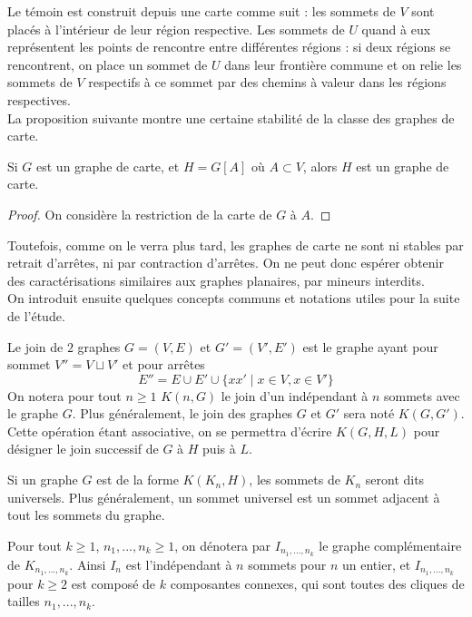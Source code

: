 \documentclass{scrartcl}
\begin{document}
\begin{flushleft}
Le témoin est construit depuis une carte comme suit : les sommets de $V$ sont placés à l'intérieur de leur région respective.
Les sommets de $U$ quand à eux représentent les points de rencontre entre différentes régions : si deux régions se rencontrent, on place
un sommet de $U$ dans leur frontière commune et on relie les sommets de $V$ respectifs à ce sommet par des chemins à valeur
dans les régions respectives.\\
La proposition suivante montre une certaine stabilité de la classe des graphes de carte.

\begin{prop}
    Si $G$ est un graphe de carte, et $H = G[A]$ où $A \subset V$, alors $H$ est un graphe de carte.
\end{prop}

\begin{proof}
    On considère la restriction de la carte de $G$ à $A$.
\end{proof}

Toutefois, comme on le verra plus tard, les graphes de carte ne sont ni stables par retrait d'arrêtes, ni par contraction d'arrêtes.
On ne peut donc espérer obtenir des caractérisations similaires aux graphes planaires, par mineurs interdits.\\
On introduit ensuite quelques concepts communs et notations utiles pour la suite de l'étude.

\begin{def*}[Join]
    Le join de $2$ graphes $G = (V, E)$ et $G' = (V', E')$ est le graphe ayant pour sommet $V'' = V \sqcup V'$ et pour arrêtes
    \[ E'' = E \cup E' \cup \{ xx' \mid x \in V, x \in V' \} \]
    On notera pour tout $n \geq 1$ $K(n, G)$ le join d'un indépendant à $n$ sommets avec le graphe $G$. Plus généralement,
    le join des graphes $G$ et $G'$ sera noté $K(G, G')$. Cette opération étant associative, on se permettra
    d'écrire $K(G, H, L)$ pour désigner le join successif de $G$ à $H$ puis à $L$.
\end{def*}

Si un graphe $G$ est de la forme $K(K_n, H)$, les sommets de $K_n$ seront dits universels. Plus généralement, un sommet universel
est un sommet adjacent à tout les sommets du graphe.

\begin{def*}
    Pour tout $k \geq 1$, $n_1, ..., n_k \geq 1$, on dénotera par $I_{n_1, ..., n_k}$ le graphe complémentaire de $K_{n_1, ..., n_k}$.
    Ainsi $I_n$ est l'indépendant à $n$ sommets pour $n$ un entier, et $I_{n_1, ..., n_k}$ pour $k \geq 2$ est composé de $k$
    composantes connexes, qui sont toutes des cliques de tailles $n_1, ..., n_k$.
\end{def*}


\end{flushleft}
\end{document}
